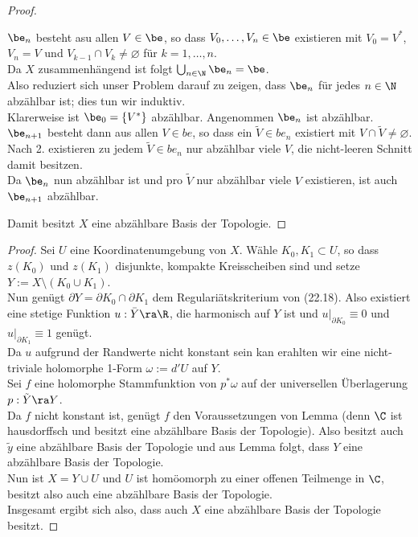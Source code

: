 \begin{proof}
\begin{enumerate}
    $\be_n$ besteht asu allen $V \in \be$, so dass $V_0, \dots, V_n
    \in \be$ existieren mit $V_0 = V^\ast$, $V_n = V$ und $V_{k-1}
    \cap V_k \neq \varnothing$ für $k = 1, \dots, n$. \\
    Da $X$ zusammenhängend ist folgt $\bigcup_{n \in \N} \be_n =
    \be$. \\
    Also reduziert sich unser Problem darauf zu zeigen, dass $\be_n$
    für jedes $n \in \N$ abzählbar ist; dies tun wir induktiv. \\
    Klarerweise ist $\be_0 = \{V^\ast\}$ abzählbar. Angenommen $\be_n$
    ist abzählbar. $\be_{n+1}$ besteht dann aus allen $V \in be$, so
    dass ein $\tilde V \in be_n$ existiert mit $V \cap \tilde V \neq
    \varnothing$. Nach 2. existieren zu jedem $\tilde V \in be_n$ nur
    abzählbar viele $V$, die nicht-leeren Schnitt damit besitzen. \\
    Da $\be_n$ nun abzählbar ist und pro $\tilde V$ nur abzählbar
    viele $V$ existieren, ist auch $\be_{n+1}$ abzählbar.
  \end{enumerate}
  Damit besitzt $X$ eine abzählbare Basis der Topologie.
\end{proof}


\begin{proof}
  Sei $U$ eine Koordinatenumgebung von $X$. Wähle $K_0, K_1 \subset
  U$, so dass $z(K_0)$ und $z(K_1)$ disjunkte, kompakte Kreisscheiben
  sind und setze $Y := X \setminus (K_0 \cup K_1)$. \\
  Nun genügt $\partial Y = \partial K_0 \cap \partial K_1$ dem
  Regulariätskriterium von (22.18). Also existiert eine stetige
  Funktion $u: \bar Y \ra \R$, die harmonisch auf $Y$ ist und
  $u|_{\partial K_0} \equiv 0$ und $u|_{\partial K_1} \equiv 1$
  genügt. \\
  Da $u$ aufgrund der Randwerte nicht konstant sein kan erahlten wir
  eine nicht-triviale holomorphe 1-Form $\omega := d' U$ auf $Y$. \\
  Sei $f$ eine holomorphe Stammfunktion von $p^\ast\omega$ auf der
  universellen Überlagerung $p: \tilde Y \ra Y$. \\
  Da $f$ nicht konstant ist, genügt $f$ den Voraussetzungen von
  Lemma \label{lemma:poincare-volterra} (denn $\C$ ist hausdorffsch
  und besitzt eine abzählbare Basis der Topologie). Also besitzt auch
  $\tilde y$ eine abzählbare Basis der Topologie und aus
  Lemma \label{lemma:surj-offen-top} folgt, dass $Y$ eine abzählbare
  Basis der Topologie. \\
  Nun ist $X = Y \cup U$ und $U$ ist homöomorph zu einer offenen
  Teilmenge in $\C$, besitzt also auch eine abzählbare Basis der
  Topologie. \\
  Insgesamt ergibt sich also, dass auch $X$ eine abzählbare Basis der
  Topologie besitzt.
\end{proof}

